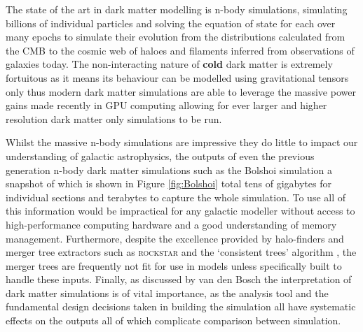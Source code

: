 The state of the art in dark matter modelling is n-body simulations, simulating billions of individual particles and solving the equation of state for each over many epochs to simulate their evolution from the distributions calculated from the CMB to the cosmic web of haloes and filaments inferred from observations of galaxies today. The non-interacting nature of \textbf{cold} dark matter is extremely fortuitous as it means its behaviour can be modelled using gravitational tensors only thus modern dark matter simulations are able to leverage the massive power gains made recently in GPU computing allowing for ever larger and higher resolution dark matter only simulations to be run. 

Whilst the massive n-body simulations are impressive they do little to impact our understanding of galactic astrophysics, the outputs of even the previous generation n-body dark matter simulations such as the Bolshoi simulation a snapshot of which is shown in Figure \ref{fig:Bolshoi} total tens of gigabytes for individual sections and terabytes to capture the whole simulation. To use all of this information would be impractical for any galactic modeller without access to high-performance computing hardware and a good understanding of memory management. Furthermore, despite the excellence provided by halo-finders and merger tree extractors such as \textsc{rockstar} \cite{Behroozi2011TheCores} and the `consistent trees' algorithm \cite{Behroozi2013GRAVITATIONALLYCOSMOLOGY}, the merger trees are frequently not fit for use in models unless specifically built to handle these inputs. Finally, as discussed by van den Bosch \cite{vandenBosch2014ComingWells, vandenBosch2017DissectingSimulation, vandenBosch2018DisruptionFiction} the interpretation of dark matter simulations is of vital importance, as the analysis tool and the fundamental design decisions taken in building the simulation all have systematic effects on the outputs all of which complicate comparison between simulation.

